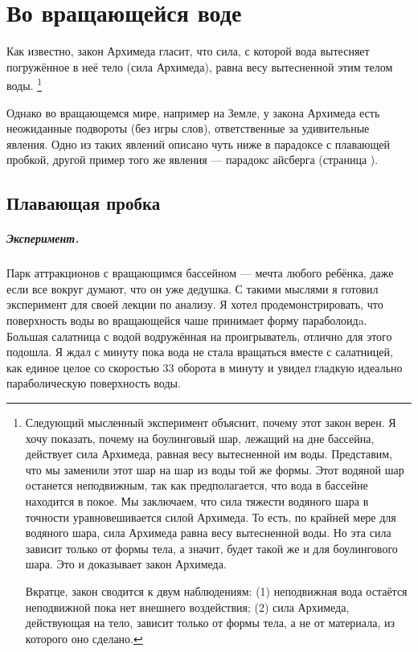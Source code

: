 \chapter{Во вращающейся воде}

Как известно, закон Архимеда гласит, что сила, с которой вода вытесняет погружённое в неё тело (сила Архимеда), равна весу вытесненной этим телом воды.%
\footnote{Следующий мысленный эксперимент объяснит, почему этот закон верен.
Я хочу показать, почему на боулинговый шар, лежащий на дне бассейна, действует сила Архимеда, равная весу вытесненной им воды.
Представим, что мы заменили этот шар на шар из воды той же формы.
Этот водяной шар останется неподвижным, так как предполагается, что вода в бассейне находится в покое.
Мы заключаем, что сила тяжести водяного шара в точности уравновешивается силой Архимеда.
То есть, по крайней мере для водяного шара, сила Архимеда равна весу вытесненной воды.
Но эта сила зависит только от формы тела, а значит, будет такой же и для боулингового шара.
Это и доказывает закон Архимеда.

Вкратце, закон сводится к двум наблюдениям:
(1) неподвижная вода остаётся неподвижной пока нет внешнего воздействия;
(2) сила Архимеда, действующая на тело, зависит только от формы тела, а не от материала, из которого оно сделано.}

Однако во вращающемся мире, например на Земле, у закона Архимеда есть неожиданные подвороты (без игры слов), ответственные за удивительные явления.
Одно из таких явлений описано чуть ниже в парадоксе с плавающей пробкой, другой пример того же явления --- парадокс айсберга (страница \pageref{sec:iceberg}).

\section{Плавающая пробка}\label{sec:cork}

\paragraph{Эксперимент.}
Парк аттракционов с вращающимся бассейном --- мечта любого ребёнка, даже если все вокруг думают, что он уже дедушка.
С такими мыслями я готовил эксперимент для своей лекции по анализу.
Я хотел продемонстрировать, что поверхность воды во вращающейся чаше принимает форму параболоидa.
Большая салатница с водой водружённая на проигрыватель, отлично для этого подошла.
Я ждал с минуту пока вода не стала вращаться вместе с салатницей, как единое целое со скоростью 33 оборота в минуту и увидел гладкую идеально параболическую поверхность воды.

